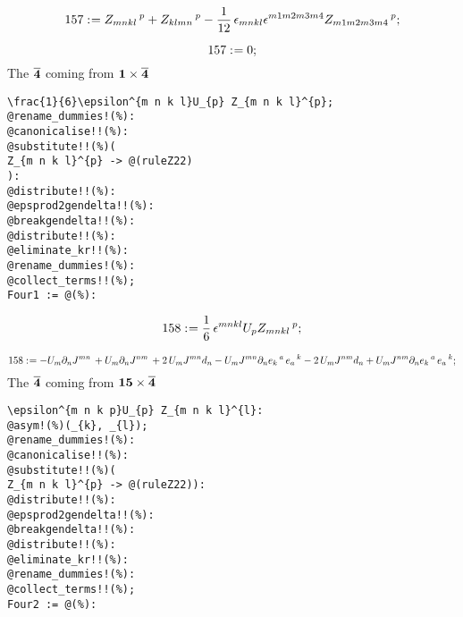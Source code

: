 \documentclass[11pt]{article}
\def\specialcolon{\mathrel{\mathop{:}}\hspace{-.5em}}
\renewcommand{\bar}[1]{\overline{#1}}
\begin{document}


\begin{dmath*}[compact, spread=2pt]
157\specialcolon{}= {Z}_{m n k l}\,^{p} + {Z}_{k l m n}\,^{p} - \frac{1}{12}\, {\epsilon}_{m n k l} {\epsilon}^{m1 m2 m3 m4} {Z}_{m1 m2 m3 m4}\,^{p};
\end{dmath*}


\begin{dmath*}[compact, spread=2pt]
157\specialcolon{}= 0;
\end{dmath*}
The $\bf \bar{4}$ coming from $\bf 1 \times \bar{4}$
{\color[named]{Blue}\begin{verbatim}
\frac{1}{6}\epsilon^{m n k l}U_{p} Z_{m n k l}^{p};
@rename_dummies!(%):
@canonicalise!!(%):
@substitute!!(%)(
Z_{m n k l}^{p} -> @(ruleZ22)
):
@distribute!!(%):
@epsprod2gendelta!!(%):
@breakgendelta!!(%):
@distribute!!(%):
@eliminate_kr!!(%):
@rename_dummies!(%):
@collect_terms!!(%);
Four1 := @(%):
\end{verbatim}}


\begin{dmath*}[compact, spread=2pt]
158\specialcolon{}= \frac{1}{6}\, {\epsilon}^{m n k l} {U}_{p} {Z}_{m n k l}\,^{p};
\end{dmath*}


\begin{dmath*}[compact, spread=2pt]
158\specialcolon{}=  - {U}_{m} {\partial}_{n}{{J}^{m n}}\,  + {U}_{m} {\partial}_{n}{{J}^{n m}}\,  + 2\, {U}_{m} {J}^{m n} {d}_{n} - {U}_{m} {J}^{m n} {\partial}_{n}{{e}_{k}\,^{a}}\,  {e}_{a}\,^{k} - 2\, {U}_{m} {J}^{n m} {d}_{n} + {U}_{m} {J}^{n m} {\partial}_{n}{{e}_{k}\,^{a}}\,  {e}_{a}\,^{k};
\end{dmath*}
The $\bf \bar{4}$ coming from $\bf 15 \times \bar{4}$
{\color[named]{Blue}\begin{verbatim}
\epsilon^{m n k p}U_{p} Z_{m n k l}^{l}:
@asym!(%)(_{k}, _{l});
@rename_dummies!(%):
@canonicalise!!(%):
@substitute!!(%)(
Z_{m n k l}^{p} -> @(ruleZ22)):
@distribute!!(%):
@epsprod2gendelta!!(%):
@breakgendelta!!(%):
@distribute!!(%):
@eliminate_kr!!(%):
@rename_dummies!(%):
@collect_terms!!(%);
Four2 := @(%):
\end{verbatim}}
\end{document}
